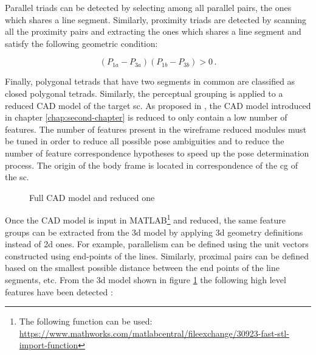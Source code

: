 Parallel triads can be detected by selecting among all parallel pairs, the ones which shares a line segment. Similarly, proximity triads are detected by scanning all the proximity pairs and extracting the ones which shares a line segment and satisfy the following geometric condition:

\begin{equation}
  (P_{1a} - P_{3a})(P_{1b}-P_{3b}) > 0 \,.
\end{equation}

Finally, polygonal tetrads that have two segments in common are classified as closed polygonal tetrads.
Similarly, the perceptual grouping is applied to a reduced CAD model of the target \acrshort{sc}. As proposed in \cite{Sharma2018}, the CAD model introduced in chapter \ref{chap:second-chapter} is reduced to only contain a low number of features. The number of features present in the wireframe reduced modules must be tuned in order to reduce all possible pose ambiguities and to reduce the number of feature correspondence hypotheses to speed up the pose determination process. The origin of the body frame is located in correspondence of the \acrshort{cg} of the \acrshort{sc}.

\begin{figure}[htbp]
  \centering
  \qquad
  \qquad
  \caption{Full CAD model and reduced one}
  \label{fig:cadModel}
\end{figure}

Once the CAD model is input in MATLAB\footnote{The following function can be used: \url{https://www.mathworks.com/matlabcentral/fileexchange/30923-fast-stl-import-function}} and reduced, the same feature groups can be extracted from the \acrshort{3d} model by applying \acrshort{3d} geometry definitions instead of \acrshort{2d} ones. For example, parallelism can be defined using the unit vectors constructed using end-points of the lines. Similarly, proximal pairs can be defined based on the smallest possible distance between the end points of the line segments, etc.
From the \acrshort{3d} model shown in figure \ref{fig:cadModel} the following high level features have been detected :

